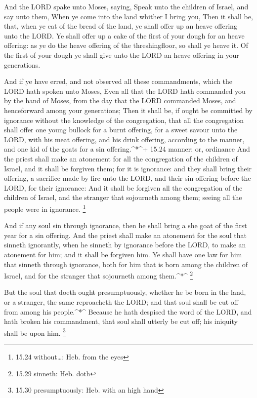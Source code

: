  And the LORD spake unto Moses, saying,  Speak
unto the children of Israel, and say unto them, When ye come into the
land whither I bring you,  Then it shall be, that, when ye
eat of the bread of the land, ye shall offer up an heave offering unto
the LORD.  Ye shall offer up a cake of the first of your
dough for an heave offering: as ye do the heave offering of the
threshingfloor, so shall ye heave it.  Of the first of your
dough ye shall give unto the LORD an heave offering in your generations.

 And if ye have erred, and not observed all these
commandments, which the LORD hath spoken unto Moses,  Even
all that the LORD hath commanded you by the hand of Moses, from the day
that the LORD commanded Moses, and henceforward among your generations;
 Then it shall be, if ought be committed by ignorance
without the knowledge of the congregation, that all the congregation
shall offer one young bullock for a burnt offering, for a sweet savour
unto the LORD, with his meat offering, and his drink offering, according
to the manner, and one kid of the goats for a sin offering.\^{}*\^{}+
15.24 manner: or, ordinance  And the priest shall make an
atonement for all the congregation of the children of Israel, and it
shall be forgiven them; for it is ignorance: and they shall bring their
offering, a sacrifice made by fire unto the LORD, and their sin offering
before the LORD, for their ignorance:  And it shall be
forgiven all the congregation of the children of Israel, and the
stranger that sojourneth among them; seeing all the people were in
ignorance. \footnote{15.24 without\ldots: Heb. from the eyes}

 And if any soul sin through ignorance, then he shall bring
a she goat of the first year for a sin offering.  And the
priest shall make an atonement for the soul that sinneth ignorantly,
when he sinneth by ignorance before the LORD, to make an atonement for
him; and it shall be forgiven him.  Ye shall have one law
for him that sinneth through ignorance, both for him that is born among
the children of Israel, and for the stranger that sojourneth among
them.\^{}*\^{} \footnote{15.29 sinneth: Heb. doth}

 But the soul that doeth ought presumptuously, whether he
be born in the land, or a stranger, the same reproacheth the LORD; and
that soul shall be cut off from among his people.\^{}*\^{} 
Because he hath despised the word of the LORD, and hath broken his
commandment, that soul shall utterly be cut off; his iniquity shall be
upon him. \footnote{15.30 presumptuously: Heb. with an high hand}

